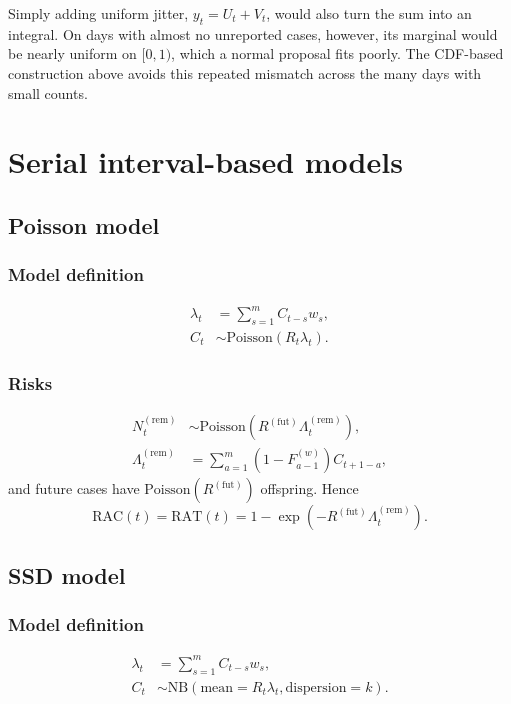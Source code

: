 \documentclass{article}
\newcommand{\PoissonDist}[1]{\mathrm{Poisson}\left(#1\right)}
\newcommand{\NBDist}[2]{\mathrm{NB}\left(\mathrm{mean}=#1,
\mathrm{dispersion}=#2\right)}
\newcommand{\Rfut}{R^{(\mathrm{fut})}}
\newcommand{\RAC}{\mathrm{RAC}}
\newcommand{\RAT}{\mathrm{RAT}}
\begin{document}
Simply adding uniform jitter, \(y_t=U_t+V_t\), would also turn the sum into
an integral. On days with almost no unreported cases, however, its marginal
would be nearly uniform on \([0,1)\), which a normal proposal fits poorly.
The CDF-based construction above avoids this repeated mismatch across the
many days with small counts.

\section{Serial interval-based models}
\subsection{Poisson model}
\subsubsection{Model definition}

\begin{align}
  \lambda_{t} &= \sum_{s=1}^{m} C_{t-s} w_s,\\
  C_t &\sim \PoissonDist{R_{t}\lambda_{t}}.
\end{align}

\subsubsection{Risks}

\begin{align}
  N^{(\mathrm{rem})}_{t} &\sim \PoissonDist{\Rfut\Lambda^{(\mathrm{rem})}_{t}},\\
  \Lambda^{(\mathrm{rem})}_{t} &= \sum_{a=1}^{m} (1-F_{a-1}^{(w)})C_{t+1-a},
\end{align}
and future cases have \(\PoissonDist{\Rfut}\) offspring. Hence
\begin{equation}
  \RAC(t)=\RAT(t)=1-\exp(-\Rfut\Lambda^{(\mathrm{rem})}_{t}).
\end{equation}

\subsection{SSD model}
\label{sec:ssd}
\subsubsection{Model definition}

\begin{align}
  \lambda_{t} &= \sum_{s=1}^{m} C_{t-s} w_s,\\
  C_t &\sim \NBDist{R_{t}\lambda_{t}}{k}.
\end{align}
\end{document}
